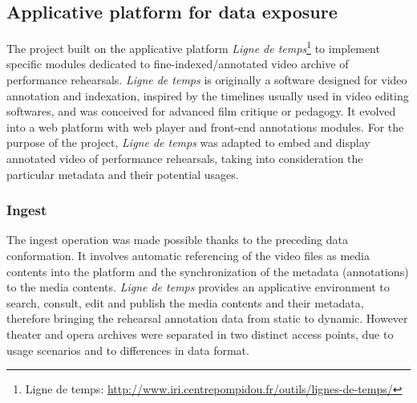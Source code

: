 \documentclass[conference]{IEEEtran}
\newcommand{\todo}[1]{\noindent\textcolor{red}{{\bf \{ToDo} #1{\bf \}}}}
\begin{document}
 



\subsection{Applicative platform for data exposure}
The project built on the applicative platform \emph{Ligne de temps}\footnote{Ligne de temps: \url{http://www.iri.centrepompidou.fr/outils/lignes-de-temps/}} to implement specific modules dedicated to fine-indexed/annotated video archive of performance rehearsals. \emph{Ligne de temps} is originally a software designed for video annotation and indexation, inspired by the timelines usually used in video editing softwares, and was conceived for advanced film critique or pedagogy. It evolved into a web platform with web player and front-end annotations modules. For the purpose of the project, \emph{Ligne de temps} was adapted to embed and display annotated video of performance rehearsals, taking into consideration the particular metadata and their potential usages.

\subsubsection{Ingest}
The ingest operation was made possible thanks to the preceding data conformation. It involves automatic referencing of the video files as media contents into the platform and the synchronization of the metadata (annotations) to the media contents. \emph{Ligne de temps} provides an applicative environment to search, consult, edit and publish the media contents and their metadata, therefore bringing the rehearsal annotation data from static to dynamic. \linebreak
However theater and opera archives were separated in two distinct access points, due to usage scenarios and to differences in data format.
\end{document}
